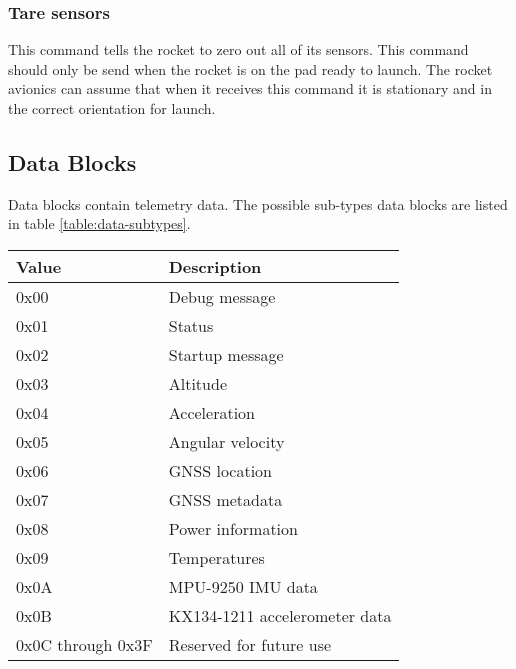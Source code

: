 \subsubsection{Tare sensors}
This command tells the rocket to zero out all of its sensors. This command should only be send when the rocket is on
the pad ready to launch. The rocket avionics can assume that when it receives this command it is stationary and in the
correct orientation for launch.

\subsection{Data Blocks}
Data blocks contain telemetry data. The possible sub-types data blocks are listed in table \ref{table:data-subtypes}.

\begin{table*}[htb]
    \centering
    \begin{tabular}{@{}ll@{}}
        \toprule
        Value             & Description                   \\
        \midrule
        0x00              & Debug message                 \\
        0x01              & Status                        \\
        0x02              & Startup message               \\
        0x03              & Altitude                      \\
        0x04              & Acceleration                  \\
        0x05              & Angular velocity              \\
        0x06              & GNSS location                 \\
        0x07              & GNSS metadata                 \\
        0x08              & Power information             \\
        0x09              & Temperatures                  \\
        0x0A              & MPU-9250 IMU data             \\
        0x0B              & KX134-1211 accelerometer data \\
        0x0C through 0x3F & Reserved for future use       \\
        \bottomrule
    \end{tabular}
    \caption{Data Block Subtypes}
    \label{table:data-subtypes}
\end{table*}

